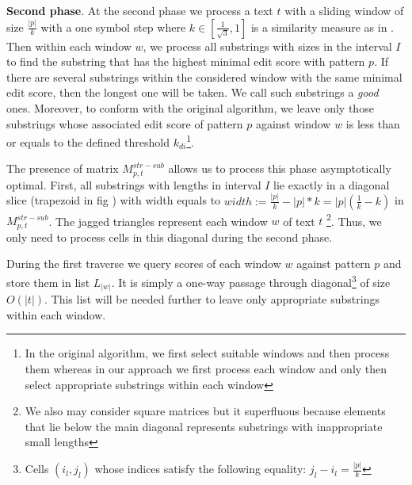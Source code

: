 \textbf{Second phase}.
At the second phase we process a text $t$ with a sliding window of size $\frac{|p|}{k}$ with a one symbol step  where $k  \in [\frac{1}{\sqrt{3}},1]$ is a similarity measure as in \cite{luciv2019interactive}.
Then within each window $w$, we process all substrings with sizes in the interval $I$ to find the substring that has the highest minimal edit score with pattern $p$. If there are several substrings within the considered window with the same minimal edit score, then the longest one will be taken.
We call such substrings a \emph{good} ones.
Moreover, to conform with the original algorithm, we leave only those substrings whose associated edit score of pattern $p$ against window $w$ is less than or equals to the defined threshold $k_{di}$\footnote{In the original algorithm, we first select suitable windows and then process them whereas in our approach we first process each window and only then select appropriate substrings within each window}.

The presence of matrix $M^{str-sub}_{p,t}$ allows us to process this phase asymptotically optimal.
First, all substrings with lengths in interval $I$ lie exactly in a diagonal slice (trapezoid in fig ) with width equals to $width:=\frac{|p|}{k} - |p|*k = |p|(\frac{1}{k}-k)$  in  $M^{str-sub}_{p,t}$.
The jagged triangles represent each window $w$ of text $t$ \footnote{ We also may consider square matrices but it superfluous because elements that lie below the main diagonal represents substrings with inappropriate small lengths}.
Thus, we only need to process cells in this diagonal during the second phase.

During the first traverse we query scores of each window $w$ against pattern $p$ and store them in list $L_{|w|}$. It is simply a one-way passage through diagonal\footnote{Cells $(i_{l},j_{l})$ whose indices satisfy the following equality: $j_{l}-i_{l} = \frac{|p|}{k}$} of size $O(|t|)$. This list will be needed further to leave only appropriate substrings within each window.

